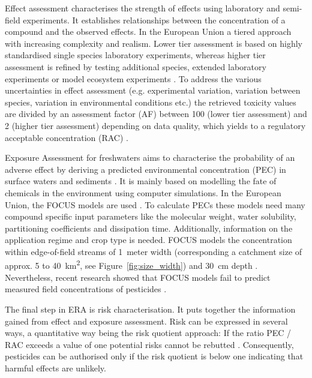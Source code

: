 Effect assessment characterises the strength of effects using laboratory and semi-field experiments.
It establishes relationships between the concentration of a compound and the observed effects.
In the European Union a tiered approach with increasing complexity and realism.
Lower tier assessment is based on highly standardised single species laboratory experiments, whereas higher tier assessment is refined by testing additional species, extended laboratory experiments or model ecosystem experiments \citep{brock_aquatic_2006}. 
To address the various uncertainties in effect assessment (e.g. experimental variation, variation between species, variation in environmental conditions etc.) the retrieved toxicity values are divided by an assessment factor (AF) between 100 (lower tier assessment) and 2 (higher tier assessment) depending on data quality, which yields to a regulatory acceptable concentration (RAC) \citep{efsa_guidance_2013, brock_aquatic_2006}. 

Exposure Assessment for freshwaters aims to characterise the probability of an adverse effect by deriving a predicted environmental concentration (PEC) in surface waters and sediments \citep{newman_fundamentals_2015}. 
It is mainly based on modelling the fate of chemicals in the environment using computer simulations. 
In the European Union, the FOCUS models are used \citep{focus_focus_2001, efsa_guidance_2013}.
To calculate PECs these models need many compound specific input parameters like the molecular weight, water solubility, partitioning coefficients and dissipation time. 
Additionally, information on the application regime and crop type is needed. 
FOCUS models the concentration within edge-of-field streams of 1~meter width (corresponding a catchment size of approx. 5 to 40~km\textsuperscript{2}, see Figure~\ref{fig:size_width}) and 30~cm depth \citep{erlacher_regulation_2011}. 
Nevertheless, recent research showed that FOCUS models fail to predict measured field concentrations of pesticides \citep{knabel_regulatory_2012, knabel_fungicide_2014}. 

The final step in ERA is risk characterisation.
It puts together the information gained from effect and exposure assessment. 
Risk can be expressed in several ways, a quantitative way being the risk quotient approach: If the ratio PEC / RAC exceeds a value of one potential risks cannot be rebutted \citep{efsa_guidance_2013, suter_ecological_2007,  solomon_probabilistic_2000}. 
Consequently, pesticides can be authorised only if the risk quotient is below one indicating that harmful effects are unlikely.



